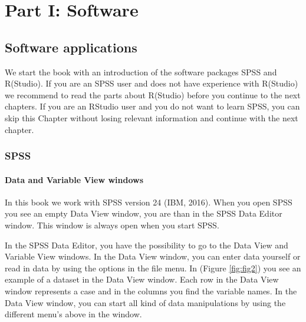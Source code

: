 \documentclass[]{book}
\begin{document}
\part{Part I: Software}\label{part-part-i-software}

\chapter{Software applications}\label{software-applications}

We start the book with an introduction of the software packages SPSS and
R(Studio). If you are an SPSS user and does not have experience with
R(Studio) we recommend to read the parts about R(Studio) before you
continue to the next chapters. If you are an RStudio user and you do not
want to learn SPSS, you can skip this Chapter without losing relevant
information and continue with the next chapter.

\section{SPSS}\label{spss}

\subsection{Data and Variable View
windows}\label{data-and-variable-view-windows}

In this book we work with SPSS version 24 (IBM, 2016). When you open
SPSS you see an empty Data View window, you are than in the SPSS Data
Editor window. This window is always open when you start SPSS.

In the SPSS Data Editor, you have the possibility to go to the Data View
and Variable View windows. In the Data View window, you can enter data
yourself or read in data by using the options in the file menu. In
(Figure \ref{fig:fig2}) you see an example of a dataset in the Data View
window. Each row in the Data View window represents a case and in the
columns you find the variable names. In the Data View window, you can
start all kind of data manipulations by using the different menu's above
in the window.
\end{document}
